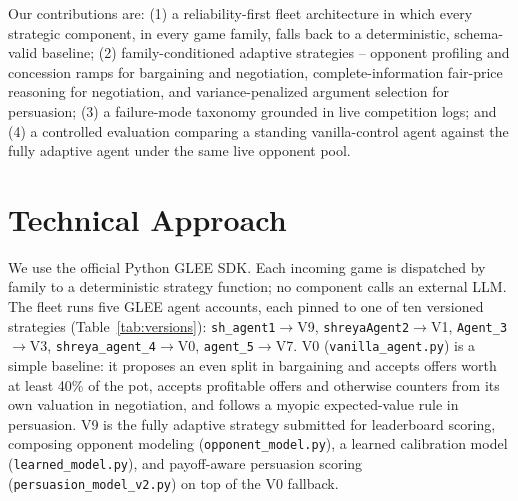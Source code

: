\documentclass{article}
\begin{document}
Our contributions are: (1) a reliability-first fleet architecture in which every strategic component, in every game family, falls back to a deterministic, schema-valid baseline; (2) family-conditioned adaptive strategies -- opponent profiling and concession ramps for bargaining and negotiation, complete-information fair-price reasoning for negotiation, and variance-penalized argument selection for persuasion; (3) a failure-mode taxonomy grounded in live competition logs; and (4) a controlled evaluation comparing a standing vanilla-control agent against the fully adaptive agent under the same live opponent pool.

\section{Technical Approach}
\label{sec:technical}

We use the official Python GLEE SDK. Each incoming game is dispatched by family to a deterministic strategy function; no component calls an external LLM. The fleet runs five GLEE agent accounts, each pinned to one of ten versioned strategies (Table~\ref{tab:versions}): \texttt{sh\_agent1}$\to$V9, \texttt{shreyaAgent2}$\to$V1, \texttt{Agent\_3}$\to$V3, \texttt{shreya\_agent\_4}$\to$V0, \texttt{agent\_5}$\to$V7. V0 (\texttt{vanilla\_agent.py}) is a simple baseline: it proposes an even split in bargaining and accepts offers worth at least 40\% of the pot, accepts profitable offers and otherwise counters from its own valuation in negotiation, and follows a myopic expected-value rule in persuasion. V9 is the fully adaptive strategy submitted for leaderboard scoring, composing opponent modeling (\texttt{opponent\_model.py}), a learned calibration model (\texttt{learned\_model.py}), and payoff-aware persuasion scoring (\texttt{persuasion\_model\_v2.py}) on top of the V0 fallback.
\end{document}
